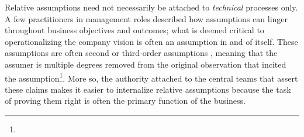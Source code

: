 
Relative assumptions need not necessarily be attached to \textit{technical} processes only. A few practitioners in management roles described how assumptions can linger throughout business objectives and outcomes; what is deemed critical to operationalizing the company vision is often an assumption in and of itself. These assumptions are often second or third-order assumptions \cite{berman2001opening,korzybski1958science}, meaning that the assumer is multiple degrees removed from the original observation that incited the assumption\footnote{}. More so, the authority attached to the central teams that assert these claims makes it easier to internalize relative assumptions because the task of proving them right is often the primary function of the business. 




